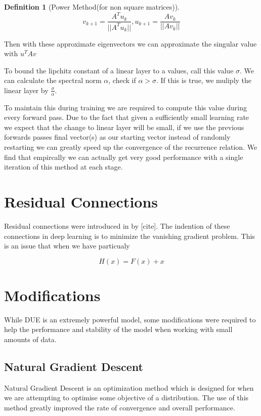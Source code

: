 \documentclass[12pt, a4paper]{report}
\theoremstyle{definition}
\newtheorem{definition}{Definition}[section]
\begin{document}
\begin{definition}[Power Method(for non square matrices)]
    $$v_{k+1} = \frac{A^Tu_k}{||A^Tu_k||}, u_{k+1} = \frac{Av_k}{||Av_k||} $$
\end{definition}

Then with these approximate eigenvectors we can approximate the singular value with $u^T A v$

To bound the lipchitz constant of a linear layer to a values, call this value $\sigma$. We can calculate the spectral norm $\alpha$, check if $\alpha > \sigma$. If this is true, we muliply the linear layer by $\frac{\sigma}{\alpha}$.

To maintain this during training we are required to compute this value during every forward pass. Due to the fact that given a sufficiently small learning rate we expect that the change to linear layer will be small, if we use the previous forwards passes final vector(s) as our starting vector instead of randomly restarting we can greatly speed up the convergence of the recurrence relation. We find that empircally we can actually get very good performance with a single iteration of this method at each stage.


\section{Residual Connections}

Residual connections were introduced in by [cite]. The indention of these connections in deep learning is to minimize the vanishing gradient problem. This is an issue that when we have particualy

$$H(x) = F(x) + x$$


\section{Modifications}

While DUE is an extremely powerful model, some modifications were required to help the performance and stability of the model when working with small amounts of data. 

\subsection{Natural Gradient Descent}

Natural Gradient Descent is an optimization method which is designed for when we are attempting to optimise some objective of a distribution. The use of this method greatly improved the rate of convergence and overall performance. \cite{NGD}
\end{document}
